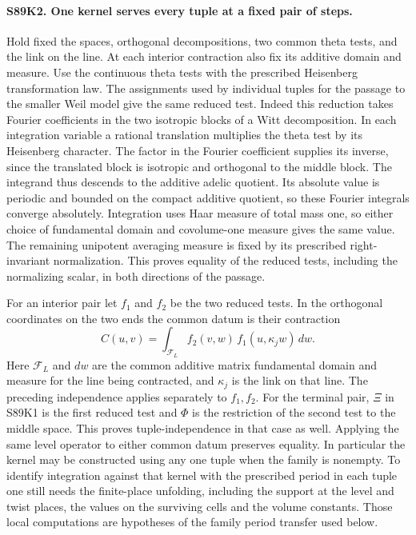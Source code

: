 \paragraph{S89K2. One kernel serves every tuple at a fixed pair of steps.}
Hold fixed the spaces, orthogonal decompositions, two common theta
tests, and the link on the line. At each interior contraction also fix
its additive domain and measure. Use the continuous theta tests with
the prescribed Heisenberg transformation law. The assignments used
by individual tuples for the passage to the smaller Weil model give
the same reduced test. Indeed this reduction takes Fourier
coefficients in the two isotropic blocks of a Witt decomposition.
In each integration variable a rational translation multiplies the
theta test by its Heisenberg character. The factor in the Fourier
coefficient supplies its inverse, since the translated block is
isotropic and orthogonal to the middle block. The integrand thus
descends to the additive adelic quotient. Its absolute value is periodic and bounded on the compact additive
quotient, so these Fourier integrals converge absolutely. Integration uses
Haar measure of total mass one, so either choice of fundamental
domain and covolume-one measure gives the same value. The remaining
unipotent averaging measure is fixed by its prescribed right-invariant
normalization. This proves equality of the reduced tests, including
the normalizing scalar, in both directions of the passage.

For an interior pair let $f_1$ and $f_2$ be the two reduced tests.
In the orthogonal coordinates on the two ends the common datum is
their contraction
\[
                C(u,v)=\int_{\mathcal F_L}
                     f_2(v,w)\,f_1(u,\kappa_j w)\,dw .
\]
Here $\mathcal F_L$ and $dw$ are the common additive matrix
fundamental domain and measure for the line being contracted, and
$\kappa_j$ is the link on that line. The preceding independence
applies separately to $f_1,f_2$. For the terminal pair, $\Xi$ in
S89K1 is the first reduced test and $\Phi$ is the restriction of
the second test to the middle space. This proves tuple-independence
in that case as well. Applying the same level operator to either
common datum preserves equality. In particular the kernel may be
constructed using any one tuple when the family is nonempty.
To identify integration against that kernel with the prescribed
period in each tuple one still needs the finite-place unfolding, including
the support at the level and twist places, the values on the
surviving cells and the volume constants. Those local computations are hypotheses of the family period
transfer used below.

